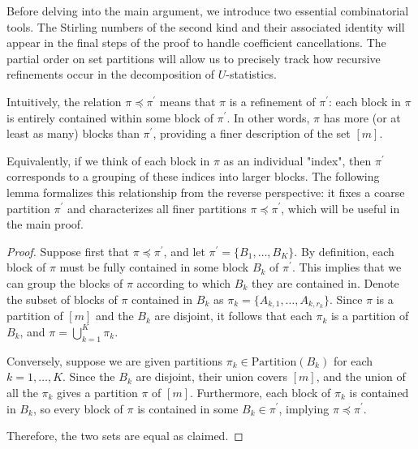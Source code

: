 \documentclass[letterpaper,11pt]{article}
\newcommand{\partition}{\mathrm{Partition}}
\newcommand{\partitionp}[1]{\partition(#1)}
\newcommand{\pleq}{\preceq}
\begin{document}

Before delving into the main argument, we introduce two essential combinatorial tools. The Stirling numbers of the second kind and their associated identity will appear in the final steps of the proof to handle coefficient cancellations. The partial order on set partitions will allow us to precisely track how recursive refinements occur in the decomposition of $U$-statistics.

Intuitively, the relation $\pi \pleq \pi^{\prime}$ means that $\pi$ is a refinement of $\pi^{\prime}$: each block in $\pi$ is entirely contained within some block of $\pi^{\prime}$. In other words, $\pi$ has more (or at least as many) blocks than $\pi^{\prime}$, providing a finer description of the set $[m]$. 

Equivalently, if we think of each block in $\pi$ as an individual "index", then $\pi^{\prime}$ corresponds to a grouping of these indices into larger blocks. The following lemma formalizes this relationship from the reverse perspective: it fixes a coarse partition $\pi^{\prime}$ and characterizes all finer partitions $\pi \pleq \pi^{\prime}$, which will be useful in the main proof.


\begin{proof}
    Suppose first that $\pi \pleq \pi^{\prime}$, and let $\pi^{\prime} = \{ B_1, \dots, B_K \}$. By definition, each block of $\pi$ must be fully contained in some block $B_k$ of $\pi^{\prime}$. This implies that we can group the blocks of $\pi$ according to which $B_k$ they are contained in. Denote the subset of blocks of $\pi$ contained in $B_k$ as $\pi_k = \{ A_{k,1}, \dots, A_{k,r_k} \}$. Since $\pi$ is a partition of $[m]$ and the $B_k$ are disjoint, it follows that each $\pi_k$ is a partition of $B_k$, and $\pi = \bigcup_{k=1}^K \pi_k$.
    
    Conversely, suppose we are given partitions $\pi_k \in \partitionp{B_k}$ for each $k = 1, \dots, K$. Since the $B_k$ are disjoint, their union covers $[m]$, and the union of all the $\pi_k$ gives a partition $\pi$ of $[m]$. Furthermore, each block of $\pi_k$ is contained in $B_k$, so every block of $\pi$ is contained in some $B_k \in \pi^{\prime}$, implying $\pi \pleq \pi^{\prime}$.
    
    Therefore, the two sets are equal as claimed.
\end{proof}
\end{document}
